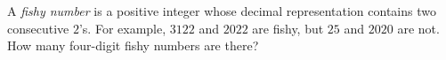 A \emph{fishy number} is a positive integer whose decimal representation contains two consecutive $2$'s. For example, $3122$ and $2022$ are fishy, but $25$ and $2020$ are not. How many four-digit fishy numbers are there?
